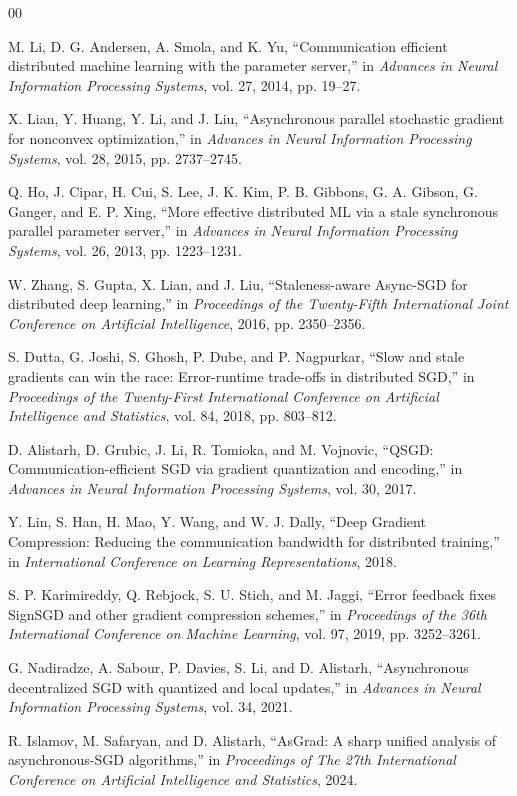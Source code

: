 \documentclass[conference]{IEEEtran}
\begin{document}
\begin{thebibliography}{00}

M. Li, D. G. Andersen, A. Smola, and K. Yu,
``Communication efficient distributed machine learning with the parameter server,''
in \textit{Advances in Neural Information Processing Systems}, vol. 27, 2014, pp. 19--27.

X. Lian, Y. Huang, Y. Li, and J. Liu,
``Asynchronous parallel stochastic gradient for nonconvex optimization,''
in \textit{Advances in Neural Information Processing Systems}, vol. 28, 2015, pp. 2737--2745.

Q. Ho, J. Cipar, H. Cui, S. Lee, J. K. Kim, P. B. Gibbons, G. A. Gibson, G. Ganger, and E. P. Xing,
``More effective distributed ML via a stale synchronous parallel parameter server,''
in \textit{Advances in Neural Information Processing Systems}, vol. 26, 2013, pp. 1223--1231.

W. Zhang, S. Gupta, X. Lian, and J. Liu,
``Staleness-aware Async-SGD for distributed deep learning,''
in \textit{Proceedings of the Twenty-Fifth International Joint Conference on Artificial Intelligence}, 2016, pp. 2350--2356.

S. Dutta, G. Joshi, S. Ghosh, P. Dube, and P. Nagpurkar,
``Slow and stale gradients can win the race: Error-runtime trade-offs in distributed SGD,''
in \textit{Proceedings of the Twenty-First International Conference on Artificial Intelligence and Statistics}, vol. 84, 2018, pp. 803--812.

D. Alistarh, D. Grubic, J. Li, R. Tomioka, and M. Vojnovic,
``QSGD: Communication-efficient SGD via gradient quantization and encoding,''
in \textit{Advances in Neural Information Processing Systems}, vol. 30, 2017.

Y. Lin, S. Han, H. Mao, Y. Wang, and W. J. Dally,
``Deep Gradient Compression: Reducing the communication bandwidth for distributed training,''
in \textit{International Conference on Learning Representations}, 2018.

S. P. Karimireddy, Q. Rebjock, S. U. Stich, and M. Jaggi,
``Error feedback fixes SignSGD and other gradient compression schemes,''
in \textit{Proceedings of the 36th International Conference on Machine Learning}, vol. 97, 2019, pp. 3252--3261.

G. Nadiradze, A. Sabour, P. Davies, S. Li, and D. Alistarh,
``Asynchronous decentralized SGD with quantized and local updates,''
in \textit{Advances in Neural Information Processing Systems}, vol. 34, 2021.

R. Islamov, M. Safaryan, and D. Alistarh,
``AsGrad: A sharp unified analysis of asynchronous-SGD algorithms,''
in \textit{Proceedings of The 27th International Conference on Artificial Intelligence and Statistics}, 2024.

\end{thebibliography}
\end{document}
